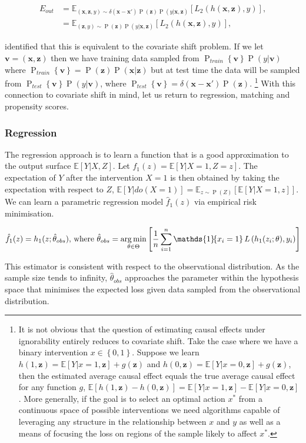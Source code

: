 \documentclass[11pt,a4paper,oneside]{book}
\newcommand{\Pns}[2]{\operatorname{P}_{#1}\left\{#2\right\}}
\newcommand{\vb}[1]{\boldsymbol{#1}}
\newcommand{\Esub}[2]{\mathbb E_{#1}\left[{#2}\right]}
\newcommand{\E}[1]{\mathbb E\left[{#1}\right]}
\newcommand{\set}[1]{\left\{#1\right\}}
\newcommand{\ind}[1]{\mathds{1}\!\!\set{#1}}
\newcommand{\argmin}{\operatornamewithlimits{arg\,min}}
\newcommand{\eqn}[1]{\begin{align}#1\end{align}}
\renewcommand{\P}[1]{\operatorname{P}\left(#1\right)}
\theoremstyle{plain}
\theoremstyle{definition}
\begin{document}
\eqn{
\label{eqn:causal_covariate_shift}
E_{out} &= \Esub{(\vb{x},\vb{z},y)\sim \delta(\vb{x}-\vb{x'})\P{\vb{z}}\P{y|\vb{x},\vb{z}}}{L_2(h(\vb{x},\vb{z}),y)},\\
&= \Esub{(\vb{z},y)\sim \P{\vb{z}}\P{y|\vb{x},\vb{z}}}{L_2(h(\vb{x},\vb{z}),y)},
}

\citet{Johansson2016_counterfactual_rep} identified that this is equivalent to the covariate shift problem. If we let $\vb{v} = (\vb{x},\vb{z})$ then we have training data sampled from $\Pns{train}{\vb{v}}\P{y|\vb{v}}$ where $\Pns{train}{\vb{v}}=\P{\vb{z}}\P{\vb{x}|\vb{z}}$ but at test time the data will be sampled from $\Pns{test}{\vb{v}}\P{y|\vb{v}}$, where $\Pns{test}{\vb{v}} = \delta(\vb{x}-\vb{x'})\P{\vb{z}}$. \footnote{It is not obvious that the question of estimating causal effects under ignorability entirely reduces to  covariate shift. Take the case where we have a binary intervention $x \in \set{0,1}$. Suppose we learn $h(1,\vb{z}) = \E{Y|x=1,\vb{z}}+g(\vb{z})$ and $h(0,\vb{z}) = \E{Y|x=0,\vb{z}}+g(\vb{z})$, then the estimated average causal effect equals the true average causal effect for any function $g$, $\E{h(1,\vb{z})-h(0,\vb{z})} = \E{Y|x=1,\vb{z}} - \E{Y|x=0,\vb{z}}$. More generally, if the goal is to select an optimal action $x^*$ from a continuous space of possible interventions we need algorithms capable of leveraging any structure in the relationship between $x$ and $y$ as well as a means of focusing the loss on regions of the sample likely to affect $x^*$.} With this connection to covariate shift in mind, let us return to regression, matching and propensity scores. 

\subsubsection{Regression}

The regression approach is to learn a function that is a good approximation to the output surface $\E{Y|X,Z}$. Let $f_1(z)= \E{Y|X=1,Z=z}$. The expectation of $Y$ after the intervention $X=1$ is then obtained by taking the expectation with respect to $Z$, $\E{Y|do(X=1)} = \Esub{z \sim \P{Z}}{\E{Y|X=1,z}}$. We can learn a parametric regression model $\hat{f}_1(z)$ via empirical risk minimisation. 

\eqn{
\hat{f}_1(z) = h_1(z;\hat{\theta}_{obs}) \text{, where } \hat{\theta}_{obs} = \argmin_{\theta \in \Theta}\left[\frac{1}{n}\sum_{i=1}^n \ind{x_i=1} L\left(h_1(z_i;\theta),y_i\right)  \right]
}

This estimator is consistent with respect to the observational distribution. As the sample size tends to infinity, $\hat{\theta}_{obs}$ approaches the parameter within the hypothesis space that minimises the expected loss given data sampled from the observational distribution. 
\end{document}
